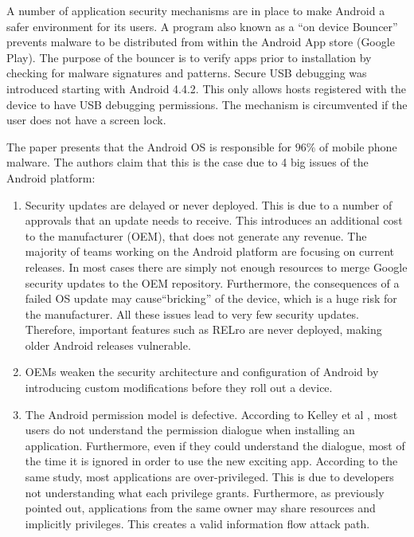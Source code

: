 A number of application security mechanisms are in place to make Android a safer environment for its users. A program also known as a ``on device Bouncer'' prevents malware to be distributed from within the Android App store (Google Play). The purpose of the bouncer is to verify apps prior to installation by checking for malware signatures and patterns. Secure USB debugging was introduced starting with Android 4.4.2. This only allows hosts registered with the device to have USB debugging permissions. The mechanism is circumvented if the user does not have a screen lock.

The paper presents that the Android OS is responsible for $96\%$ of mobile phone malware. The authors claim that this is the case due to 4 big issues of the Android platform:
\begin{enumerate}
	\item Security updates are delayed or never deployed. This is due to a number of approvals that an update needs to receive. This introduces an additional cost to the manufacturer (OEM), that does not generate any revenue. The majority of teams working on the Android platform are focusing on current releases. In most cases there are simply not enough resources to merge Google security updates to the OEM repository. Furthermore, the consequences of a failed OS update may cause``bricking'' of the device, which is a huge risk for the manufacturer. All these issues lead to very few security updates. Therefore, important features such as RELro are never deployed, making older Android releases vulnerable.
	
	\item OEMs weaken the security architecture and configuration of Android by introducing custom modifications before they roll out a device.
	
	\item The Android permission model is defective. According to Kelley et al \cite{kelley2012conundrum}, most users do not understand the permission dialogue when installing an application. Furthermore, even if they could understand the dialogue, most of the time it is ignored in order to use the new exciting app. According to the same study, most applications are over-privileged. This is due to developers not understanding what each privilege grants. Furthermore, as previously pointed out, applications from the same owner may share resources and implicitly privileges. This creates a valid information flow attack path. 
	

\end{enumerate}
